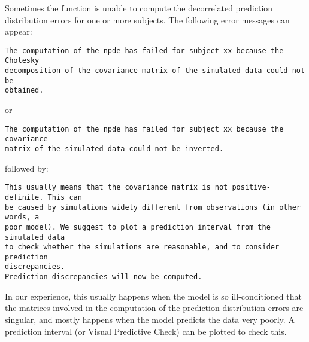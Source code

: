 \hskip 18pt Sometimes the function is unable to compute the decorrelated prediction distribution errors for one or more subjects. The following error messages can appear: 
\begin{verbatim} 
The computation of the npde has failed for subject xx because the Cholesky
decomposition of the covariance matrix of the simulated data could not be
obtained. 
\end{verbatim} 
or 
\begin{verbatim} 
The computation of the npde has failed for subject xx because the covariance
matrix of the simulated data could not be inverted. 
\end{verbatim} 
followed by:
\begin{verbatim} 
This usually means that the covariance matrix is not positive-definite. This can
be caused by simulations widely different from observations (in other words, a
poor model). We suggest to plot a prediction interval from the simulated data
to check whether the simulations are reasonable, and to consider prediction
discrepancies.
Prediction discrepancies will now be computed.
\end{verbatim} 
In our experience, this usually happens when the model is so ill-conditioned that the matrices involved in the computation of the prediction distribution errors are singular, and mostly happens when the model predicts the data very poorly. A prediction interval (or Visual Predictive Check) can be plotted to check this.

